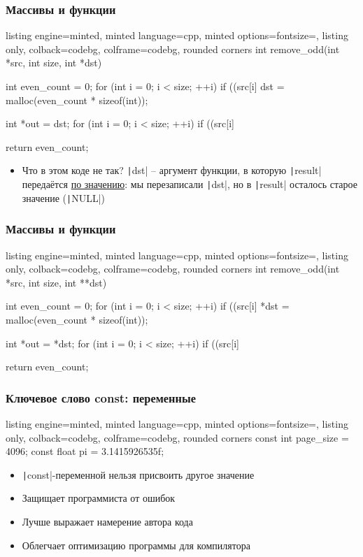 \documentclass[10pt]{beamer}
\begin{document}
\begin{frame}[fragile]
\frametitle{Массивы и функции}
\begin{tcblisting}{listing engine=minted, minted language=cpp, minted options={fontsize=\scriptsize}, listing only, colback=codebg, colframe=codebg, rounded corners}
int remove_odd(int *src, int size, int *dst) {
  int even_count = 0;
  for (int i = 0; i < size; ++i) {
    if ((src[i] %
  }
  dst = malloc(even_count * sizeof(int));

  int *out = dst;
  for (int i = 0; i < size; ++i) {
    if ((src[i] %
  }

  return even_count;
}
\end{tcblisting}
\begin{itemize}
\item Что в этом коде не так? \pause \texttt|dst| -- аргумент функции, в которую \texttt|result| передаётся \underline{по значению}: мы перезаписали \texttt|dst|, но в \texttt|result| осталось старое значение (\texttt|NULL|)
\end{itemize}
\end{frame}

\begin{frame}[fragile]
\frametitle{Массивы и функции}
\begin{tcblisting}{listing engine=minted, minted language=cpp, minted options={fontsize=\scriptsize}, listing only, colback=codebg, colframe=codebg, rounded corners}
int remove_odd(int *src, int size, int **dst) {
  int even_count = 0;
  for (int i = 0; i < size; ++i) {
    if ((src[i] %
  }
  *dst = malloc(even_count * sizeof(int));

  int *out = *dst;
  for (int i = 0; i < size; ++i) {
    if ((src[i] %
  }

  return even_count;
}
\end{tcblisting}
\end{frame}

\begin{frame}[fragile]
\frametitle{Ключевое слово const: переменные}
\begin{tcblisting}{listing engine=minted, minted language=cpp, minted options={fontsize=\scriptsize}, listing only, colback=codebg, colframe=codebg, rounded corners}
const int page_size = 4096;
const float pi = 3.1415926535f;
\end{tcblisting}
\pause
{}
\begin{itemize}
\item \texttt|const|-переменной нельзя присвоить другое значение
\pause
\item Защищает программиста от ошибок
\pause
\item Лучше выражает намерение автора кода
\pause
\item Облегчает оптимизацию программы для компилятора
\end{itemize}
\end{frame}
\end{document}
